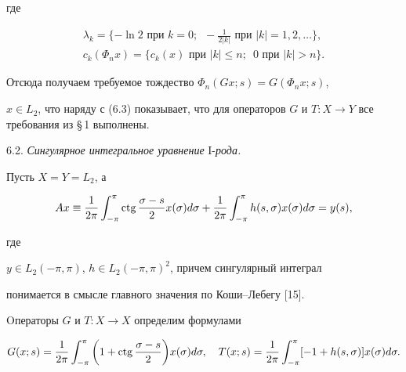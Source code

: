 где


\begin{gather*}


\lambda_k=\{-\ln 2 \text{ при } k=0;\ \; -\tfrac{1}{2|k|} \text{ при }


|k|=1,2,\dotsc\}, \\


%


c_k(\Phi_nx)=\{c_k(x) \text{ при } |k|\le n;\ \; 0\text{ при }


|k| > n\}.


\end{gather*}


Отсюда получаем требуемое тождество $\Phi_n(Gx;s)=G(\Phi_nx;s)$,


$x\in L_2$, что наряду с (6.3) показывает, что для операторов $G$ и $T:X


\to Y$ все требования из \S\,1 выполнены.


\smallskip





6.2. {\it Сингулярное интегральное уравнение} I-{\it рода.}


Пусть $X=Y=L_2$, а


\begin{equation}


Ax \equiv \frac{1}{2\pi}\int_{-\pi}^{\pi}


\ctg\frac{\sigma-s}{2}x(\sigma)d\sigma+


\frac{1}{2\pi}\int_{-\pi}^{\pi}h(s,\sigma)x(\sigma)d\sigma=y(s),


\end{equation}


где


$y \in L_2(-\pi,\pi)$, $h \in L_2(-\pi,\pi)^2$, причем сингулярный интеграл


понимается в смысле главного значения по Коши--Лебегу [15].





Oператоры $G$ и $T: X \to X$ определим формулами


\begin{equation}


G(x;s)=\frac{1}{2\pi}\int_{-\pi}^{\pi}\bigg(1+


\ctg\frac{\sigma-s}{2}\bigg)x(\sigma)d\sigma,\quad


T(x;s)=\frac{1}{2\pi}\int_{-\pi}^{\pi}[-1+h(s,\sigma)]x(\sigma)d\sigma.


\end{equation}


